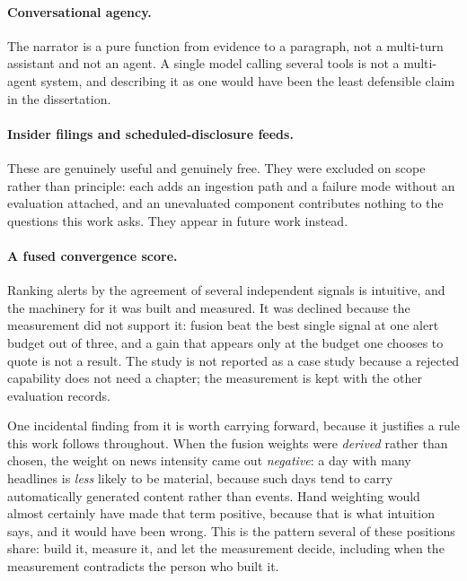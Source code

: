 \paragraph{Conversational agency.} The narrator is a pure function from evidence to a paragraph, not
a multi-turn assistant and not an agent. A single model calling several tools is not a multi-agent
system, and describing it as one would have been the least defensible claim in the dissertation.

\paragraph{Insider filings and scheduled-disclosure feeds.} These are genuinely useful and genuinely
free. They were excluded on scope rather than principle: each adds an ingestion path and a failure
mode without an evaluation attached, and an unevaluated component contributes nothing to the
questions this work asks. They appear in future work instead.

\paragraph{A fused convergence score.} Ranking alerts by the agreement of several independent
signals is intuitive, and the machinery for it was built and measured. It was declined because the
measurement did not support it: fusion beat the best single signal at one alert budget out of three,
and a gain that appears only at the budget one chooses to quote is not a result. The study is not
reported as a case study because a rejected capability does not need a chapter; the measurement is
kept with the other evaluation records.

One incidental finding from it is worth carrying forward, because it justifies a rule this work
follows throughout. When the fusion weights were \emph{derived} rather than chosen, the weight on
news intensity came out \emph{negative}: a day with many headlines is \emph{less} likely to be
material, because such days tend to carry automatically generated content rather than events. Hand
weighting would almost certainly have made that term positive, because that is what intuition says,
and it would have been wrong. This is the pattern several of these positions share: build it, measure
it, and let the measurement decide, including when the measurement contradicts the person who built
it.

